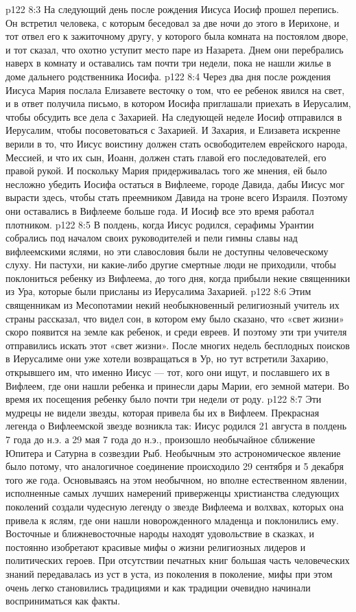 \vs p122 8:3 На следующий день после рождения Иисуса Иосиф прошел перепись. Он встретил человека, с которым беседовал за две ночи до этого в Иерихоне, и тот отвел его к зажиточному другу, у которого была комната на постоялом дворе, и тот сказал, что охотно уступит место паре из Назарета. Днем они перебрались наверх в комнату и оставались там почти три недели, пока не нашли жилье в доме дальнего родственника Иосифа.
\vs p122 8:4 Через два дня после рождения Иисуса Мария послала Елизавете весточку о том, что ее ребенок явился на свет, и в ответ получила письмо, в котором Иосифа приглашали приехать в Иерусалим, чтобы обсудить все дела с Захарией. На следующей неделе Иосиф отправился в Иерусалим, чтобы посоветоваться с Захарией. И Захария, и Елизавета искренне верили в то, что Иисус воистину должен стать освободителем еврейского народа, Мессией, и что их сын, Иоанн, должен стать главой его последователей, его правой рукой. И поскольку Мария придерживалась того же мнения, ей было несложно убедить Иосифа остаться в Вифлееме, городе Давида, дабы Иисус мог вырасти здесь, чтобы стать преемником Давида на троне всего Израиля. Поэтому они оставались в Вифлееме больше года. И Иосиф все это время работал плотником.
\vs p122 8:5 \pc В полдень, когда Иисус родился, серафимы Урантии собрались под началом своих руководителей и пели гимны славы над вифлеемскими яслями, но эти славословия были не доступны человеческому слуху. Ни пастухи, ни какие\hyp{}либо другие смертные люди не приходили, чтобы поклониться ребенку из Вифлеема, до того дня, когда прибыли некие священники из Ура, которые были присланы из Иерусалима Захарией.
\vs p122 8:6 Этим священникам из Месопотамии некий необыкновенный религиозный учитель их страны рассказал, что видел сон, в котором ему было сказано, что «свет жизни» скоро появится на земле как ребенок, и среди евреев. И поэтому эти три учителя отправились искать этот «свет жизни». После многих недель бесплодных поисков в Иерусалиме они уже хотели возвращаться в Ур, но тут встретили Захарию, открывшего им, что именно Иисус --- тот, кого они ищут, и пославшего их в Вифлеем, где они нашли ребенка и принесли дары Марии, его земной матери. Во время их посещения ребенку было почти три недели от роду.
\vs p122 8:7 Эти мудрецы не видели звезды, которая привела бы их в Вифлеем. Прекрасная легенда о Вифлеемской звезде возникла так: Иисус родился 21 августа в полдень 7 года до н.э. а 29 мая 7 года до н.э., произошло необычайное сближение Юпитера и Сатурна в созвездии Рыб. Необычным это астрономическое явление было потому, что аналогичное соединение происходило 29 сентября и 5 декабря того же года. Основываясь на этом необычном, но вполне естественном явлении, исполненные самых лучших намерений приверженцы христианства следующих поколений создали чудесную легенду о звезде Вифлеема и волхвах, которых она привела к яслям, где они нашли новорожденного младенца и поклонились ему. Восточные и ближневосточные народы находят удовольствие в сказках, и постоянно изобретают красивые мифы о жизни религиозных лидеров и политических героев. При отсутствии печатных книг большая часть человеческих знаний передавалась из уст в уста, из поколения в поколение, мифы при этом очень легко становились традициями и как традиции очевидно начинали восприниматься как факты.
